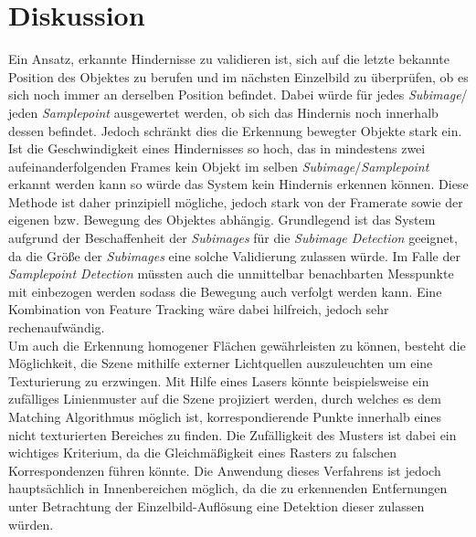 \section{Diskussion}
\label{sec:conflict_discussion}
Ein Ansatz, erkannte Hindernisse zu validieren ist, sich auf die letzte bekannte Position des Objektes zu berufen und im nächsten Einzelbild zu überprüfen, ob es sich noch immer an derselben Position befindet. Dabei würde für jedes \emph{Subimage}/ jeden \emph{Samplepoint} ausgewertet werden, ob sich das Hindernis noch innerhalb dessen befindet. Jedoch schränkt dies die Erkennung bewegter Objekte stark ein. Ist die Geschwindigkeit eines Hindernisses so hoch, das in mindestens zwei aufeinanderfolgenden Frames kein Objekt im selben \emph{Subimage}/\emph{Samplepoint} erkannt werden kann so würde das System kein Hindernis erkennen können. Diese Methode ist daher prinzipiell mögliche, jedoch stark von der Framerate sowie der eigenen bzw. Bewegung des Objektes abhängig. Grundlegend ist das System aufgrund der Beschaffenheit der \emph{Subimages} für die \emph{Subimage Detection} geeignet, da die Größe der \emph{Subimages} eine solche Validierung zulassen würde. Im Falle der \emph{Samplepoint Detection} müssten auch die unmittelbar benachbarten Messpunkte mit einbezogen werden sodass die Bewegung auch verfolgt werden kann. Eine Kombination von Feature Tracking wäre dabei hilfreich, jedoch sehr rechenaufwändig.\\

\noindent
Um auch die Erkennung homogener Flächen gewährleisten zu können, besteht die Möglichkeit, die Szene mithilfe externer Lichtquellen auszuleuchten um eine Texturierung zu erzwingen. Mit Hilfe eines Lasers könnte beispielsweise ein zufälliges Linienmuster auf die Szene projiziert werden, durch welches es dem Matching Algorithmus möglich ist, korrespondierende Punkte innerhalb eines nicht texturierten Bereiches zu finden. Die Zufälligkeit des Musters ist dabei ein wichtiges Kriterium, da die Gleichmäßigkeit eines Rasters zu falschen Korrespondenzen führen könnte. Die Anwendung dieses Verfahrens ist jedoch hauptsächlich in Innenbereichen möglich, da die zu erkennenden Entfernungen unter Betrachtung der Einzelbild-Auflösung eine Detektion dieser zulassen würden.

